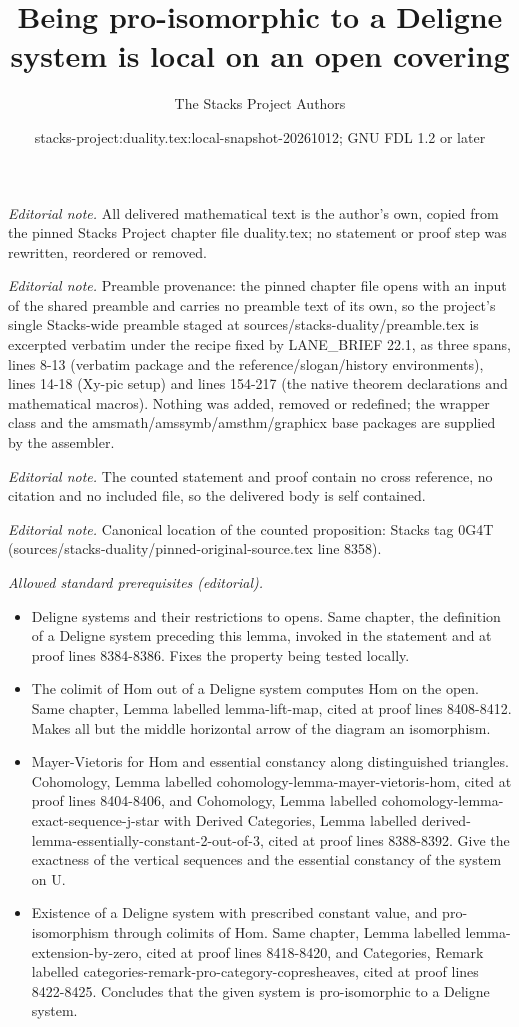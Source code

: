 \documentclass[10pt,a4paper]{amsart}
\title{Being pro-isomorphic to a Deligne system is local on an open covering}
\author{The Stacks Project Authors}
\date{stacks-project:duality.tex:local-snapshot-20261012; GNU FDL 1.2 or later}
\theoremstyle{plain}
\theoremstyle{definition}
\theoremstyle{remark}
\numberwithin{equation}{subsection}
\begin{document}
\maketitle
\noindent\textit{Editorial note.} All delivered mathematical text is the author's own, copied from the pinned Stacks Project chapter file duality.tex; no statement or proof step was rewritten, reordered or removed.\par\medskip
\noindent\textit{Editorial note.} Preamble provenance: the pinned chapter file opens with an input of the shared preamble and carries no preamble text of its own, so the project's single Stacks-wide preamble staged at sources/stacks-duality/preamble.tex is excerpted verbatim under the recipe fixed by LANE\_BRIEF 22.1, as three spans, lines 8-13 (verbatim package and the reference/slogan/history environments), lines 14-18 (Xy-pic setup) and lines 154-217 (the native theorem declarations and mathematical macros). Nothing was added, removed or redefined; the wrapper class and the amsmath/amssymb/amsthm/graphicx base packages are supplied by the assembler.\par\medskip
\noindent\textit{Editorial note.} The counted statement and proof contain no cross reference, no citation and no included file, so the delivered body is self contained.\par\medskip
\noindent\textit{Editorial note.} Canonical location of the counted proposition: Stacks tag 0G4T (sources/stacks-duality/pinned-original-source.tex line 8358).\par\medskip
\noindent\textit{Allowed standard prerequisites (editorial).}\begin{itemize}
\item Deligne systems and their restrictions to opens. Same chapter, the definition of a Deligne system preceding this lemma, invoked in the statement and at proof lines 8384-8386. Fixes the property being tested locally.
\item The colimit of Hom out of a Deligne system computes Hom on the open. Same chapter, Lemma labelled lemma-lift-map, cited at proof lines 8408-8412. Makes all but the middle horizontal arrow of the diagram an isomorphism.
\item Mayer-Vietoris for Hom and essential constancy along distinguished triangles. Cohomology, Lemma labelled cohomology-lemma-mayer-vietoris-hom, cited at proof lines 8404-8406, and Cohomology, Lemma labelled cohomology-lemma-exact-sequence-j-star with Derived Categories, Lemma labelled derived-lemma-essentially-constant-2-out-of-3, cited at proof lines 8388-8392. Give the exactness of the vertical sequences and the essential constancy of the system on U.
\item Existence of a Deligne system with prescribed constant value, and pro-isomorphism through colimits of Hom. Same chapter, Lemma labelled lemma-extension-by-zero, cited at proof lines 8418-8420, and Categories, Remark labelled categories-remark-pro-category-copresheaves, cited at proof lines 8422-8425. Concludes that the given system is pro-isomorphic to a Deligne system.
\end{itemize}\medskip
\end{document}
